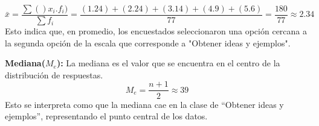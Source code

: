 \vspace{-0.6cm}
\begin{equation*}
	\bar{x} = \dfrac{\sum ()x_i . f_i)}{\sum f_i} = \dfrac{(1 . 24)+ (2 . 24) + (3 . 14) + (4 . 9) + (5 . 6)}{77} = \dfrac{180}{77} \approx 2.34
\end{equation*}
Esto indica que, en promedio, los encuestados seleccionaron una opción cercana a la segunda opción de la escala que corresponde a "Obtener ideas y ejemplos".

\vspace{-0.4cm}
\textbf{Mediana($M_e$):} La mediana es el valor que se encuentra en el centro de la distribución de respuestas.
\vspace{-0.2cm}
\begin{equation*}
	M_e = \dfrac{n + 1}{2} \approx 39
\end{equation*}
Esto se interpreta como que la mediana cae en la clase de “Obtener ideas y ejemplos”, representando el punto central de los datos.

